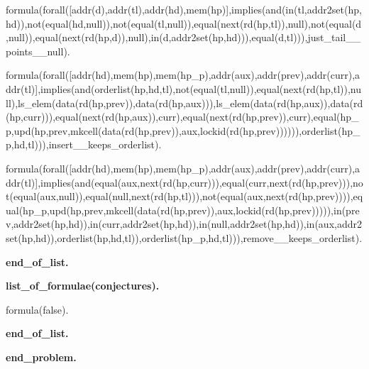 formula(forall([addr(d),addr(tl),addr(hd),mem(hp)],implies(and(in(tl,addr2set(hp,hd)),not(equal(hd,null)),not(equal(tl,null)),equal(next(rd(hp,tl)),null),not(equal(d,null)),equal(next(rd(hp,d)),null),in(d,addr2set(hp,hd))),equal(d,tl))),just\_tail\_\_points\_\_null).

formula(forall([addr(hd),mem(hp),mem(hp\_p),addr(aux),addr(prev),addr(curr),addr(tl)],implies(and(orderlist(hp,hd,tl),not(equal(tl,null)),equal(next(rd(hp,tl)),null),ls\_elem(data(rd(hp,prev)),data(rd(hp,aux))),ls\_elem(data(rd(hp,aux)),data(rd(hp,curr))),equal(next(rd(hp,aux)),curr),equal(next(rd(hp,prev)),curr),equal(hp\_p,upd(hp,prev,mkcell(data(rd(hp,prev)),aux,lockid(rd(hp,prev)))))),orderlist(hp\_p,hd,tl))),insert\_\_keeps\_orderlist).

formula(forall([addr(hd),mem(hp),mem(hp\_p),addr(aux),addr(prev),addr(curr),addr(tl)],implies(and(equal(aux,next(rd(hp,curr))),equal(curr,next(rd(hp,prev))),not(equal(aux,null)),equal(null,next(rd(hp,tl))),not(equal(aux,next(rd(hp,prev)))),equal(hp\_p,upd(hp,prev,mkcell(data(rd(hp,prev)),aux,lockid(rd(hp,prev))))),in(prev,addr2set(hp,hd)),in(curr,addr2set(hp,hd)),in(null,addr2set(hp,hd)),in(aux,addr2set(hp,hd)),orderlist(hp,hd,tl)),orderlist(hp\_p,hd,tl))),remove\_\_keeps\_orderlist).

\textbf{end\_of\_list.}


\textbf{list\_of\_formulae(conjectures).}

formula(false).

\textbf{end\_of\_list.}


\large{\textbf{end\_problem.}}



